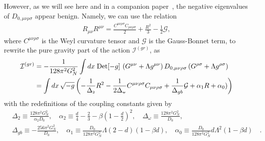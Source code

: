 \documentclass[aps,preprintnumbers,superscriptaddress,longbibliography]{revtex4-1}
\def\R2Term{\Delta_{\text{\tiny 2}}}
\def\WeylTerm{\Delta_{\text{\tiny w}}}
\begin{document}
However, as we will see here and in a companion paper~\cite{UCLnorm2023}, the negative eigenvalues of $D_{0, \mu \nu \rho \sigma}$ appear benign.
Namely, we can use the relation 
\begin{align}
R_{\mu \nu} R^{\mu \nu}
=\frac{C^{\mu\nu\rho\sigma}C_{\mu\nu\rho\sigma}}{2}+\frac{R^2}{3}-  
\frac{1}{2}\mathcal{G},
\end{align}
where $C^{\mu\nu\rho\sigma}$ is the Weyl curvature tensor
and $\mathcal{G}$ is the Gauss-Bonnet term, %
to rewrite the pure gravity part of the action $\mathcal{I}^{(gr)}$, as
\begin{align}
 \mathcal{I}^{(gr)}
&= - \frac{1}{128 \pi^2 G_N^2}\int dx \;\text{Det}[-g]\,\left(G^{\mu \nu}+\Lambda g^{\mu\nu}\right)D_{0,\mu \nu\rho \sigma}\left(G^{\rho\sigma} +\Lambda g^{\rho\sigma}\right)\nonumber\\
 &= \int  dx \,\sqrt{-g}\left(-\frac{1}{\R2Term}{R^2}-\frac{ 1}{2\WeylTerm} C^{\mu\nu\rho\sigma}C_{\mu\nu\rho\sigma} +\frac{1}{\Delta_{gb}}\mathcal{G}+\alpha_1 R+\alpha_0)\right)   
 \label{eq:PItoQG}
\end{align} 
with the redefinitions of the coupling constants given by
\begin{align}
 &    \Delta_2 \equiv \frac{128\pi^2G_N^2}{\alpha_2D_0},\quad \alpha_2\equiv\frac{d}{4}-\frac{2}{3}-\beta\left(1-\frac{d}{2}\right)^2, \quad \Delta_{\omega} \equiv\frac{128\pi^2G_N^2}{D_0}, 
     \nonumber\\
&\Delta_{gb}\equiv-\frac{256 \pi^2 G_N^2}{D_0} ,\quad  \alpha_1\equiv\frac{D_0}{128 \pi^2 G_N^2}\Lambda(2-d)(1-\beta d),\quad \alpha_0\equiv\frac{D_0}{128 \pi^2 G_N^2}d\Lambda^2(1-\beta d) \quad.
\label{eq:translation}
\end{align}
\end{document}
